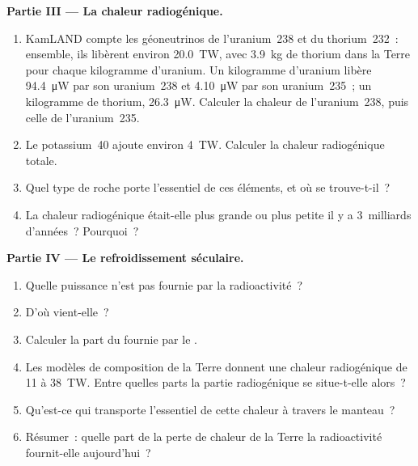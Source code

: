 \begin{problem}
\medskip
\noindent\textbf{Partie III --- La chaleur radiogénique.}
\begin{enumerate}[resume]
  \item KamLAND compte les géoneutrinos de l'uranium~238 et du
        thorium~232~: ensemble, ils libèrent environ \qty{20.0}{TW}, avec
        \qty{3.9}{kg} de thorium dans la Terre pour chaque kilogramme
        d'uranium. Un kilogramme d'uranium libère \qty{94.4}{\micro W} par
        son uranium~238 et \qty{4.10}{\micro W} par son uranium~235~; un
        kilogramme de thorium, \qty{26.3}{\micro W}. Calculer la chaleur de
        l'uranium~238, puis celle de l'uranium~235.
  \item Le potassium~40 ajoute environ \qty{4}{TW}. Calculer la chaleur
        radiogénique totale.
  \item Quel type de roche porte l'essentiel de ces éléments, et où se
        trouve-t-il~?
  \item La chaleur radiogénique était-elle plus grande ou plus petite il y a
        3~milliards d'années~? Pourquoi~?
\end{enumerate}

\medskip
\noindent\textbf{Partie IV --- Le refroidissement séculaire.}
\begin{enumerate}[resume]
  \item Quelle puissance n'est pas fournie par la radioactivité~?
  \item D'où vient-elle~?
  \item Calculer la part du  fournie par le
        .
  \item Les modèles de composition de la Terre donnent une chaleur
        radiogénique de 11 à \qty{38}{TW}. Entre quelles parts la partie
        radiogénique se situe-t-elle alors~?
  \item Qu'est-ce qui transporte l'essentiel de cette chaleur à travers le
        manteau~?
  \item Résumer~: quelle part de la perte de chaleur de la Terre la
        radioactivité fournit-elle aujourd'hui~?
\end{enumerate}
\end{problem}
